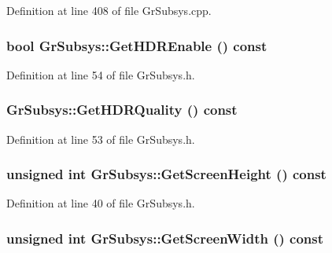Definition at line 408 of file GrSubsys.cpp.\hypertarget{class_gr_subsys_7729f2d94ac04a53a95086298b1dfef5}{
\subsubsection[{GetHDREnable}]{\setlength{\rightskip}{0pt plus 5cm}bool GrSubsys::GetHDREnable () const}}
\label{class_gr_subsys_7729f2d94ac04a53a95086298b1dfef5}




Definition at line 54 of file GrSubsys.h.\hypertarget{class_gr_subsys_4cdb145baf1da08648bb3148793556e9}{
\subsubsection[{GetHDRQuality}]{ GrSubsys::GetHDRQuality () const}}
\label{class_gr_subsys_4cdb145baf1da08648bb3148793556e9}




Definition at line 53 of file GrSubsys.h.\hypertarget{class_gr_subsys_ebabe946b174172886fc4370dc755257}{
\subsubsection[{GetScreenHeight}]{\setlength{\rightskip}{0pt plus 5cm}unsigned int GrSubsys::GetScreenHeight () const}}
\label{class_gr_subsys_ebabe946b174172886fc4370dc755257}




Definition at line 40 of file GrSubsys.h.\hypertarget{class_gr_subsys_0b72dbb98da668bbbc0cc46038b804e5}{
\subsubsection[{GetScreenWidth}]{\setlength{\rightskip}{0pt plus 5cm}unsigned int GrSubsys::GetScreenWidth () const}}
\label{class_gr_subsys_0b72dbb98da668bbbc0cc46038b804e5}




